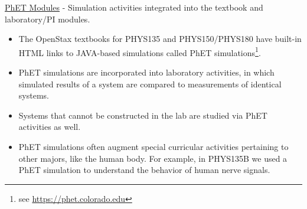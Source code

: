 \documentclass[../../../main.tex]{subfiles}
\begin{document}
\underline{PhET Modules} - Simulation activities integrated into the textbook and laboratory/PI modules.
\begin{itemize}
\item The OpenStax textbooks for PHYS135 and PHYS150/PHYS180 have built-in HTML links to JAVA-based simulations called PhET simulations\footnote{see \url{https://phet.colorado.edu}}.
\item PhET simulations are incorporated into laboratory activities, in which simulated results of a system are compared to measurements of identical systems.
\item Systems that cannot be constructed in the lab are studied via PhET activities as well.
\item PhET simulations often augment special curricular activities pertaining to other majors, like the human body.  For example, in PHYS135B we used a PhET simulation to understand the behavior of human nerve signals.
\end{itemize}
\end{document}
